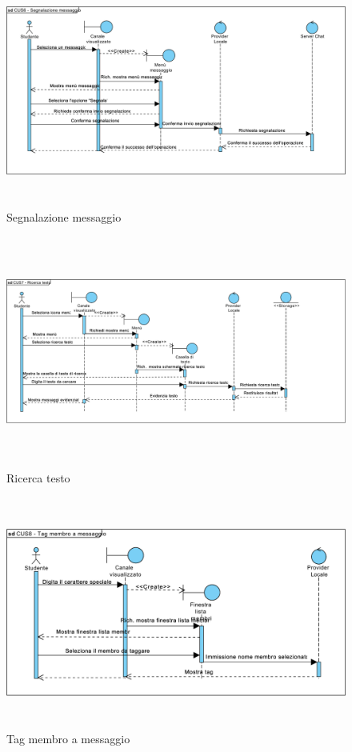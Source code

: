 \begin{figure}
	\centering
	\includegraphics[height=3in,width=5in]{imgs/gruppo6/sequence/CUS6_segnalazione_messaggio.pdf}
	\caption{Segnalazione messaggio}
	\label{fig:prova}
\end{figure}

\begin{figure}
	\centering
	\includegraphics[height=3in,width=5in]{imgs/gruppo6/sequence/CUS7_ricerca_testo.pdf}
	\caption{Ricerca testo}
	\label{fig:prova}
\end{figure}

\begin{figure}
	\centering
	\includegraphics[height=3in,width=5in]{imgs/gruppo6/sequence/CUS8_tag_membro_a_messaggio.pdf}
	\caption{Tag membro a messaggio}
	\label{fig:prova}
\end{figure}

